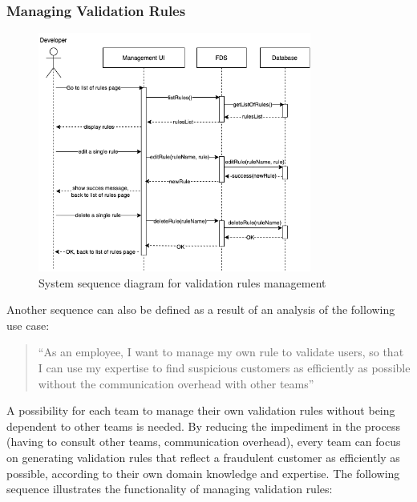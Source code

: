 \subsubsection{Managing Validation Rules}
 \label{subsection:management}

\begin{figure}[!ht]
  \centering
  \includegraphics[width=0.8\textwidth]{diagrams/sequence-management.png}
  \caption{System sequence diagram for validation rules management}
  \label{fig:management_sequence}
\end{figure}

Another sequence can also be defined as a result of an analysis of the following use case:

\begin{quotation}
 \enquote{As an employee, I want to manage my own rule to validate users, so that I can use my expertise to find suspicious customers as efficiently as possible without the communication overhead with other teams} 
\end{quotation}

A possibility for each team to manage their own validation rules without being dependent to other teams is needed. By reducing the impediment in the process (having to consult other teams, communication overhead), every team can focus on generating validation rules that reflect a fraudulent customer as efficiently as possible, according to their own domain knowledge and expertise. The following sequence illustrates the functionality of managing validation rules:

